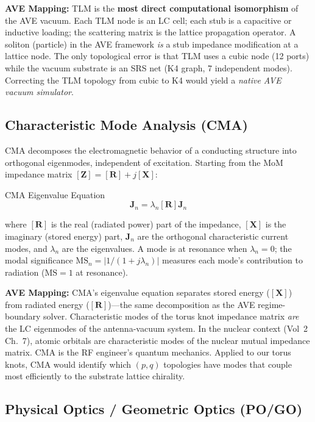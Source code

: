 \textbf{AVE Mapping:} TLM is the \textbf{most direct computational isomorphism} of the AVE vacuum. Each TLM node is an LC cell; each stub is a capacitive or inductive loading; the scattering matrix is the lattice propagation operator. A soliton (particle) in the AVE framework \textit{is} a stub impedance modification at a lattice node. The only topological error is that TLM uses a cubic node (12 ports) while the vacuum substrate is an SRS net (K4 graph, 7 independent modes). Correcting the TLM topology from cubic to K4 would yield a \textit{native AVE vacuum simulator}.

\subsection{Characteristic Mode Analysis (CMA)}

CMA decomposes the electromagnetic behavior of a conducting structure into orthogonal eigenmodes, independent of excitation. Starting from the MoM impedance matrix $[\mathbf{Z}] = [\mathbf{R}] + j[\mathbf{X}]$:
\begin{resultbox}{CMA Eigenvalue Equation}
\begin{equation}
    [\mathbf{X}]\mathbf{J}_n = \lambda_n [\mathbf{R}]\mathbf{J}_n
    \label{eq:cma}
\end{equation}
\end{resultbox}
where $[\mathbf{R}]$ is the real (radiated power) part of the impedance, $[\mathbf{X}]$ is the imaginary (stored energy) part, $\mathbf{J}_n$ are the orthogonal characteristic current modes, and $\lambda_n$ are the eigenvalues. A mode is at resonance when $\lambda_n = 0$; the modal significance $\text{MS}_n = |1/(1+j\lambda_n)|$ measures each mode's contribution to radiation ($\text{MS} = 1$ at resonance).

\textbf{AVE Mapping:} CMA's eigenvalue equation separates stored energy ($[\mathbf{X}]$) from radiated energy ($[\mathbf{R}]$)---the same decomposition as the AVE regime-boundary solver. Characteristic modes of the torus knot impedance matrix \textit{are} the LC eigenmodes of the antenna-vacuum system. In the nuclear context (Vol~2 Ch.~7), atomic orbitals are characteristic modes of the nuclear mutual impedance matrix. CMA is the RF engineer's quantum mechanics. Applied to our torus knots, CMA would identify which $(p,q)$ topologies have modes that couple most efficiently to the substrate lattice chirality.

\subsection{Physical Optics / Geometric Optics (PO/GO)}

